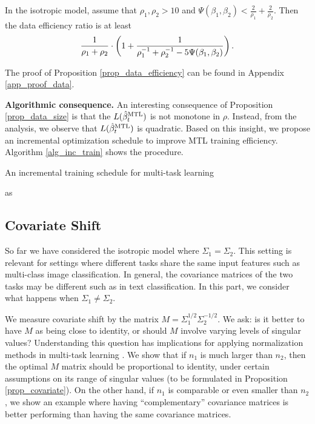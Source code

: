 \begin{proposition}\label{prop_data_efficiency}
	In the isotropic model, assume that $\rho_1,\rho_2 > 10$ and $\Psi(\beta_1, \beta_2) < \frac{2}{\rho_1} + \frac{2}{\rho_2}$.
	Then the data efficiency ratio is at least \[ \frac{1}{\rho_1 + \rho_2}\cdot \left({1 + \frac{1}{\rho_1^{-1} + \rho_2^{-1} - 5\Psi(\beta_1, \beta_2)}}\right). \]
\end{proposition}
The proof of Proposition \ref{prop_data_efficiency} can be found in Appendix \ref{app_proof_data}.

\textbf{Algorithmic consequence.} An interesting consequence of Proposition \ref{prop_data_size} is that the $L(\hat{\beta}_t^{\text{MTL}})$ is not monotone in $\rho$.
Instead, from the analysis, we observe that $L(\hat{\beta}_t^{\text{MTL}})$ is quadratic.
Based on this insight, we propose an incremental optimization schedule to improve MTL training efficiency.
Algorithm \ref{alg_inc_train} shows the procedure.

\begin{algorithm}[!t]
	\caption{An incremental training schedule for multi-task learning}
	\label{alg_inc_train}
	\begin{algorithmic}[1]
		\State as
	\end{algorithmic}
\end{algorithm}
\subsection{Covariate Shift}

So far we have considered the isotropic model where $\Sigma_1 = \Sigma_2$.
This setting is relevant for settings where different tasks share the same input features such as multi-class image classification.
In general, the covariance matrices of the two tasks may be different such as in text classification.
In this part, we consider what happens when $\Sigma_1 \neq \Sigma_2$.

We measure covariate shift by the matrix $M = \Sigma_1^{1/2} \Sigma_2^{-1/2}$.
We ask: is it better to have $M$ as being close to identity, or should $M$ involve varying levels of singular values?
Understanding this question has implications for applying normalization methods in multi-task learning \cite{LV19,CBLR18,YKGLHF20}.
We show that if $n_1$ is much larger than $n_2$, then the optimal $M$ matrix should be proportional to identity, under certain assumptions on its range of singular values (to be formulated in Proposition \ref{prop_covariate}).
On the other hand, if $n_1$ is comparable or even smaller than $n_2$, we show an example where having ``complementary'' covariance matrices is better performing than having the same covariance matrices.

